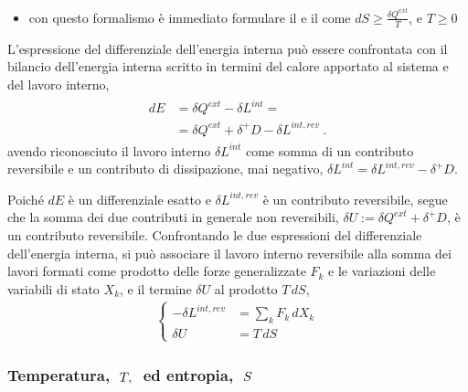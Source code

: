 \documentclass[letterpaper,10pt,italian]{jupyterBook}
\begin{document}
\sphinxAtStartPar
{}
\begin{itemize}
\item {} 
\sphinxAtStartPar
con questo formalismo è immediato formulare il  e il  come \(dS \ge \frac{\delta Q^{ext}}{T}\), e \(T \ge 0\)

\end{itemize}

\sphinxAtStartPar
L’espressione del differenziale dell’energia interna può essere confrontata con il bilancio dell’energia interna scritto in termini del calore apportato al sistema e del lavoro interno,
\begin{equation*}
\begin{split}\begin{aligned}
  d E & = \delta Q^{ext} - \delta L^{int} = \\
      & = \delta Q^{ext} + \delta^+ D - \delta L^{int,rev} \ .
\end{aligned}\end{split}
\end{equation*}
\sphinxAtStartPar
avendo riconosciuto il lavoro interno \(\delta L^{int}\) come somma di un contributo reversibile e un contributo di dissipazione, mai negativo, \(\delta L^{int} = \delta L^{int,rev} - \delta^+ D\).

\sphinxAtStartPar
Poiché \(d E\) è un differenziale esatto e \(\delta L^{int,rev}\) è un contributo reversibile, segue che la somma dei due contributi in generale non reversibili, \(\delta U := \delta Q^{ext} + \delta^+ D\), è un contributo reversibile. Confrontando le due espressioni del differenziale dell’energia interna, si può associare il lavoro interno reversibile alla somma dei lavori formati come prodotto delle forze generalizzate \(F_k\) e le variazioni delle variabili di stato \(X_k\), e il termine \(\delta U\) al prodotto \(T \, dS\),
\begin{equation*}
\begin{split}\begin{cases}
  -\delta L^{int,rev} & = \displaystyle\sum_k F_k \, d X_k \\
  \delta U            & = T \, dS
\end{cases}\end{split}
\end{equation*}\subsubsection*{Temperatura, \protect\(\ T, \ \protect\) ed entropia, \protect\(\ S\protect\)}
\end{document}

